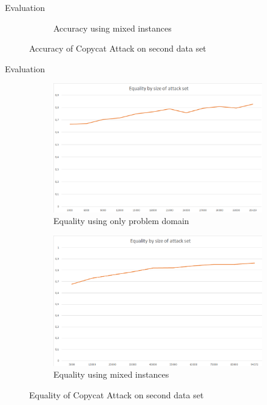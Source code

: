 \documentclass[10pt]{beamer}
\begin{document}
\begin{frame}[fragile]{Evaluation}
\begin{figure}[h!]
\begin{subfigure}[c]{0.49\textwidth}
                \caption{Accuracy using mixed instances }
                \label{fig:Accuracy_cat_mix}
            \end{subfigure}
            \caption{Accuracy of Copycat Attack on second data set}
            \label{fig:accuracy_cat}
        \end{figure}
\end{frame}
\begin{frame}[fragile]{Evaluation}
       \begin{figure}[h!]
            \centering
            \begin{subfigure}[c]{0.49\textwidth}
                \centering
                \includegraphics[width=1\textwidth]{exercise_3/paper/images/Equality_copy_cat_domain.png}
                \caption{Equality using only problem domain}
                \label{fig:Equality_cat_domain}
            \end{subfigure}
            \begin{subfigure}[c]{0.49\textwidth}
                \centering
                \includegraphics[width=1\textwidth]{exercise_3/paper/images/Equality_copy_cat.png}
                \caption{Equality using mixed instances}
                \label{fig:Equality_cat_mix}
            \end{subfigure}
            \caption{Equality of Copycat Attack on second data set}
            \label{fig:equality_cat}
        \end{figure}
\end{frame}
\end{document}
